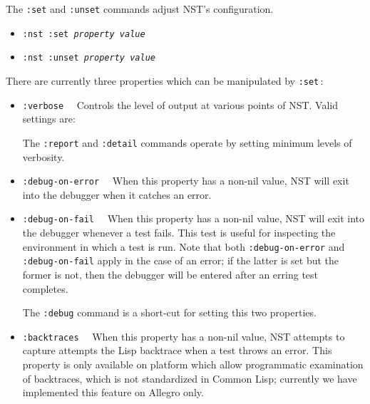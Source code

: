 The \texttt{:set} and \texttt{:unset} commands adjust NST's
configuration.
\begin{itemize}
\item\texttt{:nst :set {\itshape property} {\itshape value}}
\item\texttt{:nst :unset {\itshape property} {\itshape value}}
\end{itemize}
There are currently three properties which can be manipulated by
\texttt{:set}\,:
\begin{itemize}
\item\texttt{:verbose}~~ Controls the
  level of output at various points of NST.  Valid settings are:

  The \texttt{:report} and \texttt{:detail} commands operate by
  setting minimum levels of verbosity.

\item\texttt{:debug-on-error}~~
  When this property has a non-nil value, NST will exit into the
  debugger when it catches an error.

\item\texttt{:debug-on-fail}~~
  When this property has a non-nil value, NST will exit into the
  debugger whenever a test fails.  This test is useful for inspecting
  the environment in which a test is run.  Note that both
  \texttt{:debug-on-error} and \texttt{:debug-on-fail} apply in the
  case of an error; if the latter is set but the former is not, then
  the debugger will be entered after an erring test completes.

  The \texttt{:debug} command is a short-cut for setting this
  two properties.

\item\texttt{:backtraces}~~
  When this property has a non-nil value, NST attempts to capture
  attempts the Lisp backtrace when a test throws an error.  This
  property is only available on platform which allow programmatic
  examination of backtraces, which is not standardized in Common Lisp;
  currently we have implemented this feature on Allegro only.


\end{itemize}
